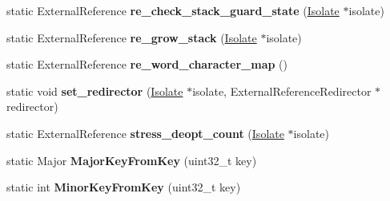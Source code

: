 \begin{DoxyCompactItemize}
\item 
\hypertarget{classv8_1_1internal_1_1_b_a_s_e___e_m_b_e_d_d_e_d_a45703b4f5362d959e29d07c489e05f10}{}static External\+Reference {\bfseries re\+\_\+check\+\_\+stack\+\_\+guard\+\_\+state} (\hyperlink{classv8_1_1internal_1_1_isolate}{Isolate} $\ast$isolate)\label{classv8_1_1internal_1_1_b_a_s_e___e_m_b_e_d_d_e_d_a45703b4f5362d959e29d07c489e05f10}

\item 
\hypertarget{classv8_1_1internal_1_1_b_a_s_e___e_m_b_e_d_d_e_d_aae46c3d8c8640f2687f7d6bf447b0768}{}static External\+Reference {\bfseries re\+\_\+grow\+\_\+stack} (\hyperlink{classv8_1_1internal_1_1_isolate}{Isolate} $\ast$isolate)\label{classv8_1_1internal_1_1_b_a_s_e___e_m_b_e_d_d_e_d_aae46c3d8c8640f2687f7d6bf447b0768}

\item 
\hypertarget{classv8_1_1internal_1_1_b_a_s_e___e_m_b_e_d_d_e_d_a5cc4870c8e0e019f3768f198f29194af}{}static External\+Reference {\bfseries re\+\_\+word\+\_\+character\+\_\+map} ()\label{classv8_1_1internal_1_1_b_a_s_e___e_m_b_e_d_d_e_d_a5cc4870c8e0e019f3768f198f29194af}

\item 
\hypertarget{classv8_1_1internal_1_1_b_a_s_e___e_m_b_e_d_d_e_d_abcb97ad057257dd217436fb413e1e421}{}static void {\bfseries set\+\_\+redirector} (\hyperlink{classv8_1_1internal_1_1_isolate}{Isolate} $\ast$isolate, External\+Reference\+Redirector $\ast$redirector)\label{classv8_1_1internal_1_1_b_a_s_e___e_m_b_e_d_d_e_d_abcb97ad057257dd217436fb413e1e421}

\item 
\hypertarget{classv8_1_1internal_1_1_b_a_s_e___e_m_b_e_d_d_e_d_a13191f384cc746276c4fef7ffaef0778}{}static External\+Reference {\bfseries stress\+\_\+deopt\+\_\+count} (\hyperlink{classv8_1_1internal_1_1_isolate}{Isolate} $\ast$isolate)\label{classv8_1_1internal_1_1_b_a_s_e___e_m_b_e_d_d_e_d_a13191f384cc746276c4fef7ffaef0778}

\item 
\hypertarget{classv8_1_1internal_1_1_b_a_s_e___e_m_b_e_d_d_e_d_a7decc3e58f8f18f9d8736cead781cfe6}{}static Major {\bfseries Major\+Key\+From\+Key} (uint32\+\_\+t key)\label{classv8_1_1internal_1_1_b_a_s_e___e_m_b_e_d_d_e_d_a7decc3e58f8f18f9d8736cead781cfe6}

\item 
\hypertarget{classv8_1_1internal_1_1_b_a_s_e___e_m_b_e_d_d_e_d_a38354ecdc8de21714aeac9f311b6eb68}{}static int {\bfseries Minor\+Key\+From\+Key} (uint32\+\_\+t key)\label{classv8_1_1internal_1_1_b_a_s_e___e_m_b_e_d_d_e_d_a38354ecdc8de21714aeac9f311b6eb68}


\end{DoxyCompactItemize}
